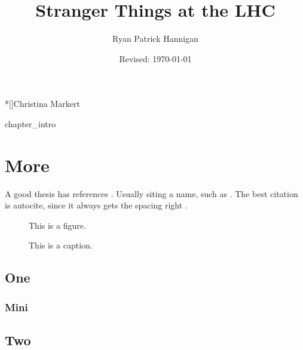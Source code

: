 \documentclass{utthesis}
\begin{document}
\author{Ryan Patrick Hannigan} 
\title{Stranger Things at the LHC} 
\date{Revised: \today}

\frontmatter

\UTcopyrightlegend %

\begin{UTcommittee}
\end{UTcommittee}


\setcounter{page}{4}



%
%

\begin{UTabstract}*[]{Christina Markert}
    
\end{UTabstract}


\tableofcontents

\listoffigures

\mainmatter

 {chapter_intro}

\chapter{More}

A good thesis has references \cite{bib:somebook}. Usually siting a name, such as \textcite{bib:someart}. The best citation is autocite, since it always gets the spacing right \autocite{bib:somethesis}.

\lipsum[3]
\begin{figure}
This is a figure.
\caption[This]{This is a caption.}
\end{figure}
\section{One}
\subsection{Mini}
\section{Two}
\end{document}
